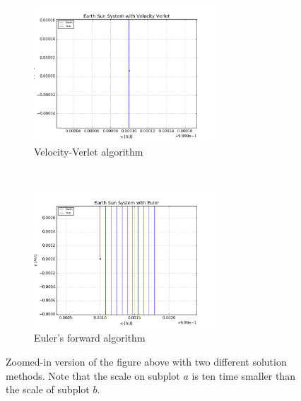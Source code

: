 \documentclass[a4paper, 10pt]{article}
\begin{document}
\begin{figure}[t!]
    \centering
    \begin{subfigure}[t]{0.5\textwidth}
        \centering
        \includegraphics[height=2.0in]{orbitESVV.png}
        \caption{Velocity-Verlet algorithm}
    \end{subfigure}%
    ~ 
    \begin{subfigure}[t]{0.5\textwidth}
        \centering
        \includegraphics[height=2.0in]{orbitESEuler.png}
        \caption{Euler's forward algorithm}
    \end{subfigure}
    \caption{Zoomed-in version of the figure above with two different solution methods. Note that the scale on subplot $a$ is ten time smaller than the scale of subplot $b$.}
\end{figure}
\end{document}
